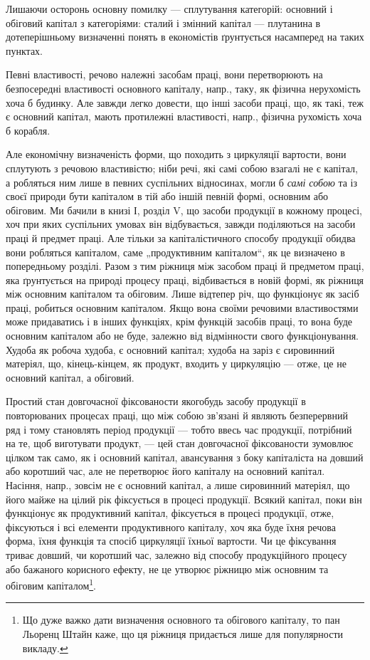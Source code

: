 Лишаючи осторонь основну помилку — сплутування категорій: основний
і обіговий капітал з категоріями: сталий і змінний капітал — плутанина
в дотеперішньому визначенні понять в економістів ґрунтується насамперед
на таких пунктах.

Певні властивості, речово належні засобам праці, вони перетворюють
на безпосередні властивості основного капіталу, напр., таку, як фізична
нерухомість хоча б будинку. Але завжди легко довести, що інші засоби
праці, що, як такі, теж є основний капітал, мають протилежні властивості,
напр., фізична рухомість хоча б корабля.

Але економічну визначеність форми, що походить з циркуляції вартости,
вони сплутують з речовою властивістю; ніби речі, які самі собою
взагалі не є капітал, а робляться ним лише в певних суспільних відносинах,
могли б \emph{самі собою} та із своєї природи бути капіталом в
тій або іншій певній формі, основним або обіговим. Ми бачили в книзі
І, розділ V, що засоби продукції в кожному процесі, хоч при яких суспільних
умовах він відбувається, завжди поділяються на засоби праці й
предмет праці. Але тільки за капіталістичного способу продукції обидва
вони робляться капіталом, саме „продуктивним капіталом“, як це
визначено в попередньому розділі. Разом з тим ріжниця між засобом
праці й предметом праці, яка ґрунтується на природі процесу праці,
відбивається в новій формі, як ріжниця між основним капіталом та обіговим.
Лише відтепер річ, що функціонує як засіб праці, робиться основним
капіталом. Якщо вона своїми речовими властивостями може придаватись
і в інших функціях, крім функцій засобів праці, то вона буде
основним капіталом або не буде, залежно від відмінности свого функціонування.
Худоба як робоча худоба, є основний капітал; худоба на заріз
є сировинний матеріял, що, кінець-кінцем, як продукт, входить у
циркуляцію — отже, це не основний капітал, а обіговий.

Простий стан довгочасної фіксованости якогобудь засобу продукції
в повторюваних процесах праці, що між собою зв’язані й являють
безперервний ряд і тому становлять період продукції — тобто ввесь час
продукції, потрібний на те, щоб виготувати продукт, — цей стан довгочасної
фіксованости зумовлює цілком так само, як і основний капітал,
авансування з боку капіталіста на довший або коротший час, але не
перетворює його капіталу на основний капітал. Насіння, напр., зовсім не
є основний капітал, а лише сировинний матеріял, що його майже на
цілий рік фіксується в процесі продукції. Всякий капітал, поки він функціонує
як продуктивний капітал, фіксується в процесі продукції, отже,
фіксуються і всі елементи продуктивного капіталу, хоч яка буде їхня речова
форма, їхня функція та спосіб циркуляції їхньої вартости. Чи це фіксування
триває довший, чи коротший час, залежно від способу продукційного
процесу або бажаного корисного ефекту, не це утворює ріжницю між
основним та обіговим капіталом\footnote{
Що дуже важко дати визначення основного та обігового капіталу, то пан
Льоренц Штайн каже, що ця ріжниця придається лише для популярности викладу.
}.

